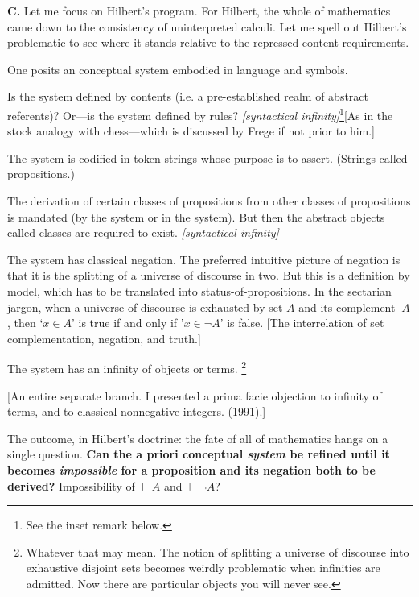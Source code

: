 \jarule

\textbf{C.} Let me focus on Hilbert's program. For Hilbert, the whole of mathematics came down to the consistency of uninterpreted calculi. Let me spell out Hilbert's problematic to see where it stands relative to the repressed content-requirements.

One posits an  conceptual system embodied in language and symbols.

Is the system defined by contents (i.e. a pre-established realm of abstract referents)? Or---is the system defined by rules? \textit{[syntactical infinity]}\footnote{See the inset remark below.}[As in the stock analogy with chess---which is discussed by Frege if not prior to him.]

The system is codified in token-strings whose purpose is to assert. (Strings called propositions.)

The derivation of certain classes of propositions from other classes of propositions is mandated (by the system or in the system). But then the abstract objects called classes are required to exist. \textit{[syntactical infinity]}

The system has classical negation. The preferred intuitive picture of negation is that it is the splitting of a universe of discourse in two. But this is a definition by model, which has to be translated into status-of-propositions. In the sectarian jargon, when a universe of discourse is exhausted by set $A$ and its complement $~A$, then `$x\in A$' is true if and only if '$x\in\lnot A$' is false. [The interrelation of set complementation, negation, and truth.]

The system has an infinity of objects or terms. \footnote{Whatever that may mean. The notion of splitting a universe of discourse into exhaustive disjoint sets becomes weirdly problematic when infinities are admitted. Now there are particular objects you will never see.}

[An entire separate branch. I presented a prima facie objection to infinity of terms, and to classical nonnegative integers.  (1991).]

The outcome, in Hilbert's doctrine: the fate of all of mathematics hangs on a single question. \textbf{Can the a priori conceptual \textit{system} be refined until it becomes \textit{impossible} for a proposition and its negation both to be derived?} Impossibility of $\vdash A$ and $\vdash\lnot A$?

